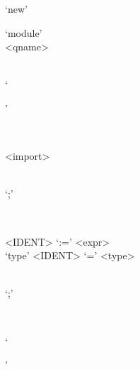 \documentclass[droidmono,libertine,twoside,user,unofficial]{ecarticle}
\newcommand{\optSemiCol}{\begin{stack}\\`;'\end{stack}}
\begin{document}
  \begin{syntdiag}
    `new'
    \begin{stack}
      `module'
      \\
      <qname>
    \end{stack}
    \begin{stack}
      \\
      `{'
        \begin{stack}
          \\
          \begin{rep}
            <import> \optSemiCol
            \\
          \end{rep}
        \end{stack}
        \begin{rep}
        \begin{stack}
          <IDENT> `:=' <expr>
          \\
          `type' <IDENT> `=' <type>
        \end{stack}
        \optSemiCol
        \\
      \end{rep}
      `}'
    \end{stack}
  \end{syntdiag}
\end{document}
